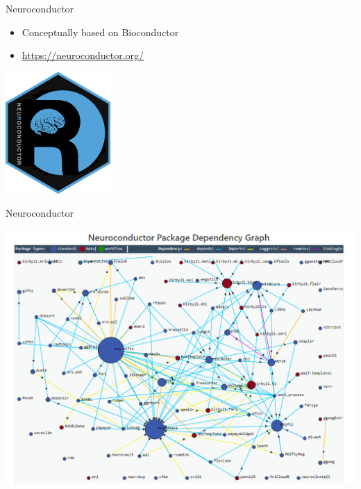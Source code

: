 \documentclass[ignorenonframetext,]{beamer}
\providecommand{\tightlist}{%
  \setlength{\itemsep}{0pt}\setlength{\parskip}{0pt}}
\begin{document}
\begin{frame}{Neuroconductor}
\protect\hypertarget{neuroconductor}{}

\begin{itemize}
\tightlist
\item
  Conceptually based on Bioconductor
\item
  \url{https://neuroconductor.org/}
\end{itemize}

\includegraphics[width=0.3\textwidth,height=\textheight]{../external/images/neuro_logo1.png}

\end{frame}

\begin{frame}{Neuroconductor}
\protect\hypertarget{neuroconductor-1}{}

\includegraphics{../external/images/neuro_depend.png}

\end{frame}
\end{document}
